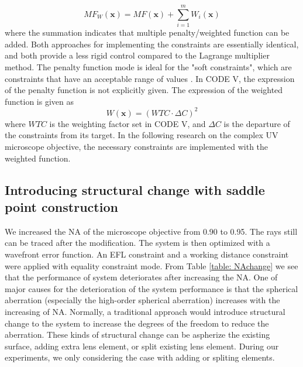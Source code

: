 \setlength{\belowdisplayshortskip}{10pt}
\begin{equation} \label{eq: MFw}
MF_W(\textbf{x})=MF(\textbf{x})+\sum_{i=1}^{m}W_i(\textbf{x})
\end{equation}
where the summation indicates that multiple penalty/weighted function can be added. Both approaches for implementing the constraints are essentially identical, and both provide a less rigid control compared to the Lagrange multiplier method. The penalty function mode is ideal for the "soft constraints", which are constraints that have an acceptable range of values \cite{codevmanual}. In CODE V, the expression of the penalty function is not explicitly given. The expression of the weighted function is given as
\setlength{\belowdisplayshortskip}{5pt}
\setlength{\abovedisplayshortskip}{5pt}
\begin{equation} \label{eq: WTC}
W(\textbf{x})=(WTC\cdot \Delta C)^2
\end{equation}
where $WTC$ is the weighting factor set in CODE V, and $\Delta C$ is the departure of the constraints from its target. In the following research on the complex UV microscope objective, the necessary constraints are implemented with the weighted function.

\subsection{Introducing structural change with saddle point construction}
We increased the NA of the microscope objective from 0.90 to 0.95. The rays still can be traced after the modification. The system is then optimized with a wavefront error function. An EFL constraint and a working distance constraint were applied with equality constraint mode. From Table \ref{table: NAchange} we see that the performance of system deteriorates after increasing the NA. One of major causes for the deterioration of the system performance is that the spherical aberration (especially the high-order spherical aberration) increases with the increasing of NA. Normally, a traditional approach would introduce structural change to the system to increase the degrees of the freedom to reduce the aberration. These kinds of structural change can be aspherize the existing surface, adding extra lens element, or split existing lens element. During our experiments, we only considering the case with adding or spliting elements.   

